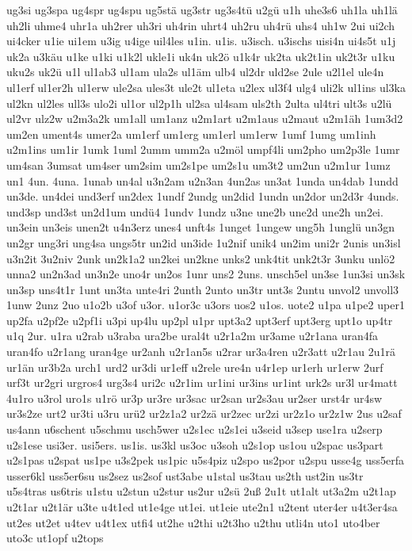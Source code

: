 {ug3si
ug3spa
ug4spr
ug4spu
ug5stä
ug3str
ug3s4tü
u2gü
u1h
uhe3s6
uh1la
uh1lä
uh2li
uhme4
uhr1a
uh2rer
uh3ri
uh4rin
uhrt4
uh2ru
uh4rü
uhs4
uh1w
2ui
ui2ch
ui4cker
u1ie
ui1em
u3ig
u4ige
uil4les
u1in.
u1is.
u3isch.
u3ischs
uisi4n
ui4s5t
u1j
uk2a
u3käu
u1ke
u1ki
u1k2l
ukle1i
uk4n
uk2ö
u1k4r
uk2ta
uk2t1in
uk2t3r
u1ku
uku2s
uk2ü
u1l
ul1ab3
ul1am
ula2s
ul1äm
ulb4
ul2dr
uld2se
2ule
u2l1el
ule4n
ul1erf
ul1er2h
ul1erw
ule2sa
ules3t
ule2t
ul1eta
u2lex
ul3f4
ulg4
uli2k
ul1ins
ul3ka
ul2kn
ul2les
ull3s
ulo2i
ul1or
ul2p1h
ul2sa
ul4sam
uls2th
2ulta
ul4tri
ult3s
u2lü
ul2vr
ulz2w
u2m3a2k
um1all
um1anz
u2m1art
u2m1aus
u2maut
u2m1äh
1um3d2
um2en
ument4s
umer2a
um1erf
um1erg
um1erl
um1erw
1umf
1umg
um1inh
u2m1ins
um1ir
1umk
1uml
2umm
umm2a
u2möl
umpf4li
um2pho
um2p3le
1umr
um4san
3umsat
um4ser
um2sim
um2s1pe
um2s1u
um3t2
um2un
u2m1ur
1umz
un1
4un.
4una.
1unab
un4al
u3n2am
u2n3an
4un2as
un3at
1unda
un4dab
1undd
un3de.
un4dei
und3erf
un2dex
1undf
2undg
un2did
1undn
un2dor
un2d3r
4unds.
und3sp
und3st
un2d1um
undü4
1undv
1undz
u3ne
une2b
une2d
une2h
un2ei.
un3ein
un3eis
unen2t
u4n3erz
unes4
unft4s
1unget
1ungew
ung5h
1unglü
un3gn
un2gr
ung3ri
ung4sa
ungs5tr
un2id
un3ide
1u2nif
unik4
un2im
uni2r
2unis
un3isl
u3n2it
3u2niv
2unk
un2k1a2
un2kei
un2kne
unks2
unk4tit
unk2t3r
3unku
unlö2
unna2
un2n3ad
un3n2e
uno4r
un2os
1unr
uns2
2uns.
unsch5el
un3se
1un3si
un3sk
un3sp
uns4t1r
1unt
un3ta
unte4ri
2unth
2unto
un3tr
unt3s
2untu
unvol2
unvoll3
1unw
2unz
2uo
u1o2b
u3of
u3or.
u1or3c
u3ors
uos2
u1os.
uote2
u1pa
u1pe2
uper1
up2fa
u2pf2e
u2pf1i
u3pi
up4lu
up2pl
u1pr
upt3a2
upt3erf
upt3erg
upt1o
up4tr
u1q
2ur.
u1ra
u2rab
u3raba
ura2be
ural4t
u2r1a2m
ur3ame
u2r1ana
uran4fa
uran4fo
u2r1ang
uran4ge
ur2anh
u2r1an5s
u2rar
ur3a4ren
u2r3att
u2r1au
2u1rä
ur1än
ur3b2a
urch1
urd2
ur3di
ur1eff
u2rele
ure4n
u4r1ep
ur1erh
ur1erw
2urf
urf3t
ur2gri
urgros4
urg3s4
uri2c
u2r1im
ur1ini
ur3ins
ur1int
urk2s
ur3l
ur4matt
4u1ro
u3rol
uro1s
u1rö
ur3p
ur3re
ur3sac
ur2san
ur2s3au
ur2ser
urst4r
ur4sw
ur3s2ze
urt2
ur3ti
u3ru
urü2
ur2z1a2
ur2zä
ur2zec
ur2zi
ur2z1o
ur2z1w
2us
u2saf
us4ann
u6schent
u5schmu
usch5wer
u2s1ec
u2s1ei
u3seid
u3sep
use1ra
u2serp
u2s1ese
usi3er.
usi5ers.
us1is.
us3kl
us3oc
u3soh
u2s1op
us1ou
u2spac
us3part
u2s1pas
u2spat
us1pe
u3s2pek
us1pic
u5s4piz
u2spo
us2por
u2spu
usse4g
uss5erfa
usser6kl
uss5er6su
us2sez
us2sof
ust3abe
u1stal
us3tau
us2th
ust2in
us3tr
u5s4tras
us6tris
u1stu
u2stun
u2stur
us2ur
u2sü
2uß
2u1t
ut1alt
ut3a2m
u2t1ap
u2t1ar
u2t1är
u3te
u4t1ed
ut1e4ge
ut1ei.
ut1eie
ute2n1
u2tent
uter4er
u4t3er4sa
ut2es
ut2et
u4tev
u4t1ex
utfi4
ut2he
u2thi
u2t3ho
u2thu
utli4n
uto1
uto4ber
uto3c
ut1opf
u2tops
}
